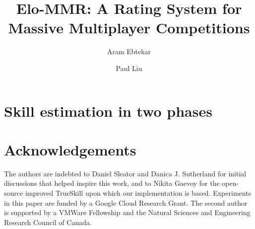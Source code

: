 \documentclass[sigconf,screen]{acmart}
\title{Elo-MMR: A Rating System for Massive Multiplayer Competitions}
\author{Aram Ebtekar}
\affiliation{%
  \city{Vancouver}
  \state{BC}
  \country{Canada}
}
\author{Paul Liu}
\affiliation{%
  \institution{Stanford University}
  \city{Stanford}
  \state{CA}
  \country{USA}
}
\begin{document}



\maketitle



\section{Skill estimation in two phases}
\label{sec:main-alg}
    
    
    






\section*{Acknowledgements}
The authors are indebted to Daniel Sleator and Danica J. Sutherland for initial discussions that helped inspire this work, and to Nikita Gaevoy for the open-source improved TrueSkill upon which our implementation is based. Experiments in this paper are funded by a Google Cloud Research Grant. The second author is supported by a VMWare Fellowship and the Natural Sciences and Engineering Research Council of Canada.

\balance

% 



\end{document}
